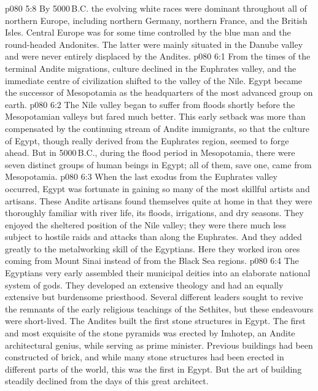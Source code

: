 \vs p080 5:8 \pc By 5000\,B.C. the evolving white races were dominant throughout all of northern Europe, including northern Germany, northern France, and the British Isles. Central Europe was for some time controlled by the blue man and the round\hyp{}headed Andonites. The latter were mainly situated in the Danube valley and were never entirely displaced by the Andites.
\vs p080 6:1 From the times of the terminal Andite migrations, culture declined in the Euphrates valley, and the immediate centre of civilization shifted to the valley of the Nile. Egypt became the successor of Mesopotamia as the headquarters of the most advanced group on earth.
\vs p080 6:2 The Nile valley began to suffer from floods shortly before the Mesopotamian valleys but fared much better. This early setback was more than compensated by the continuing stream of Andite immigrants, so that the culture of Egypt, though really derived from the Euphrates region, seemed to forge ahead. But in 5000\,B.C., during the flood period in Mesopotamia, there were seven distinct groups of human beings in Egypt; all of them, save one, came from Mesopotamia.
\vs p080 6:3 \pc When the last exodus from the Euphrates valley occurred, Egypt was fortunate in gaining so many of the most skillful artists and artisans. These Andite artisans found themselves quite at home in that they were thoroughly familiar with river life, its floods, irrigations, and dry seasons. They enjoyed the sheltered position of the Nile valley; they were there much less subject to hostile raids and attacks than along the Euphrates. And they added greatly to the metalworking skill of the Egyptians. Here they worked iron ores coming from Mount Sinai instead of from the Black Sea regions.
\vs p080 6:4 \pc The Egyptians very early assembled their municipal deities into an elaborate national system of gods. They developed an extensive theology and had an equally extensive but burdensome priesthood. Several different leaders sought to revive the remnants of the early religious teachings of the Sethites, but these endeavours were short\hyp{}lived. The Andites built the first stone structures in Egypt. The first and most exquisite of the stone pyramids was erected by Imhotep, an Andite architectural genius, while serving as prime minister. Previous buildings had been constructed of brick, and while many stone structures had been erected in different parts of the world, this was the first in Egypt. But the art of building steadily declined from the days of this great architect.
